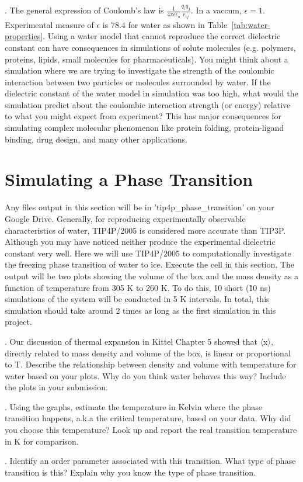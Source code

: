 \documentclass{article}
\begin{document}
\vspace*{1cm}
. The general expression of Coulomb's law is $\frac{1}{4 \pi \epsilon \epsilon_o}\frac{q_i q_j}{r_{ij}}$. In a vaccum, $\epsilon = 1$. Experimental measure of $\epsilon$ is 78.4 for water as shown in Table~\ref{tab:water-properties}. Using a water model that cannot reproduce the correct dielectric constant can have consequences in simulations of solute molecules (e.g. polymers, proteins, lipids, small molecules for pharmaceuticals). You might think about a simulation where we are trying to investigate the strength of the coulombic interaction between two particles or molecules surrounded by water. If the dielectric constant of the water model in simulation was too high, what would the simulation predict about the coulombic interaction strength (or energy) relative to what you might expect from experiment? This has major consequences for simulating complex molecular phenomenon like protein folding, protein-ligand binding, drug design, and many other applications.

\section{Simulating a Phase Transition}

Any files output in this section will be in 'tip4p\_phase\_transition' on your Google Drive. Generally, for reproducing experimentally observable characteristics of water, TIP4P/2005 is considered more accurate than TIP3P. Although you may have noticed neither produce the experimental dielectric constant very well. Here we will use TIP4P/2005 to computationally investigate the freezing phase transition of water to ice. Execute the cell in this section. The output will be two plots showing the volume of the box and the mass density as a function of temperature from 305 K to 260 K. To do this, 10 short (\~10 ns) simulations of the system will be conducted in 5 K intervals. In total, this simulation should take around 2 times as long as the first simulation in this project. 

\vspace*{1cm}
. Our discussion of thermal expansion in Kittel Chapter 5 showed that $\langle$x$\rangle$, directly related to mass density and volume of the box, is linear or proportional to T. Describe the relationship between density and volume with temperature for water based on your plots. Why do you think water behaves this way? Include the plots in your submission.

\vspace*{1cm}
. Using the graphs, estimate the temperature in Kelvin where the phase transition happens, a.k.a the critical temperature, based on your data. Why did you choose this temperature? Look up and report the real transition temperature in K for comparison. 

\vspace*{1cm}
. Identify an order parameter associated with this transition. What type of phase transition is this? Explain why you know the type of phase transition.

\newpage


\end{document}
